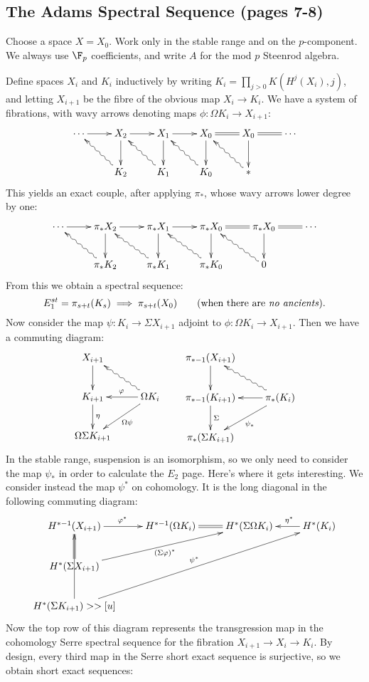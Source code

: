 \documentclass[11pt]{article}
\begin{document}
\subsection*{The Adams Spectral Sequence (pages 7-8)}
Choose a space $X=X_0$. Work only in the stable range  and on the $p$-component. We always use $\F_p$ coefficients, and write $A$ for the mod $p$ Steenrod algebra.

Define spaces $X_i$ and $K_i$ inductively by writing $K_i=\prod_{j>0}K(H^j(X_i),j)$, and letting $X_{i+1}$ be the fibre of the obvious map $X_i\to K_i$. We have a system of fibrations, with wavy arrows denoting maps $\phi:\Omega K_i\to X_{i+1}$:
\[\xymatrix{
\cdots\ar[r]&
X_2\ar[r]\ar[d]&
X_1\ar[r]\ar[d]&
X_0\ar@{=}[r]\ar[d]&
X_0\ar@{=}[r]\ar[d]&
\cdots\\
&
K_2\ar@{~>}[ul]&
K_1\ar@{~>}[ul]&
K_0\ar@{~>}[ul]&
\ast\ar@{~>}[ul]&
}\]
This yields an exact couple, after applying $\pi_*$, whose wavy arrows lower degree by one:
\[\xymatrix{
\cdots\ar[r]&
\pi_*X_2\ar[r]\ar[d]&
\pi_*X_1\ar[r]\ar[d]&
\pi_*X_0\ar@{=}[r]\ar[d]&
\pi_*X_0\ar@{=}[r]\ar[d]&
\cdots\\
&
\pi_*K_2\ar@{~>}[ul]&
\pi_*K_1\ar@{~>}[ul]&
\pi_*K_0\ar@{~>}[ul]&
0\ar@{~>}[ul]&
}
\]
From this we obtain a spectral sequence:
\[E_1^{st}=\pi_{s+t}(K_s)\implies \pi_{s+t}(X_0)\textup{\qquad (when there are \textit{no ancients}).}\]
Now consider the map $\psi:K_i\to\Sigma X_{i+1}$ adjoint to $\phi:\Omega K_i\to X_{i+1}$. Then we have a commuting diagram:
\[\xymatrix{
X_{i+1}\ar[d]\\
K_{i+1}\ar[d]^\eta&\Omega K_i\ar[l]_\phi\ar[ld]^{\Omega\psi}\ar@{~>}[lu]\\
\Omega\Sigma K_{i+1}
}
\qquad 
\xymatrix{
\pi_{*-1}(X_{i+1})\ar[d]\\
\pi_{*-1}(K_{i+1})\ar[d]^\Sigma&\pi_{*} (K_i)\ar[l]\ar[ld]^{\psi_*}\ar@{~>}[lu]\\
\pi_{*}(\Sigma K_{i+1})
}
\]
In the stable range, suspension is an isomorphism, so we only need to consider the map $\psi_*$ in order to calculate the $E_2$ page. Here's where it gets interesting. We consider instead the map $\psi^*$ on cohomology. It is the long diagonal in the following commuting diagram:
\[\xymatrix{
H^{*-1}(X_{i+1})\ar@{=}[d]\ar[r]^{\phi^*}&H^{*-1}(\Omega K_i)\ar@{=}[r]&H^*(\Sigma\Omega K_i)& H^*(K_i)\ar[l]_{\quad  \eta^*}\\
H^{*}(\Sigma X_{i+1})\ar[rru]_{(\Sigma\phi)^*}&\\
H^*(\Sigma K_{i+1})\ar[uurrr]^{\psi^*}\xyfib[u]
}\]
Now the top row of this diagram represents the transgression map in the cohomology Serre spectral sequence for the fibration $X_{i+1}\to X_i\to K_i$. By design, every third map in the Serre short exact sequence is surjective, so we obtain short exact sequences:
\end{document}
